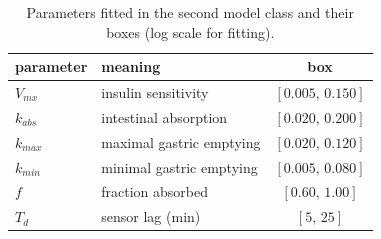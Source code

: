 \begin{table}[h]
\centering\small
\begin{tabular}{llc}
\toprule
parameter & meaning & box \\
\midrule
$V_{mx}$ & insulin sensitivity & $[0.005,\,0.150]$ \\
$k_{abs}$ & intestinal absorption & $[0.020,\,0.200]$ \\
$k_{max}$ & maximal gastric emptying & $[0.020,\,0.120]$ \\
$k_{min}$ & minimal gastric emptying & $[0.005,\,0.080]$ \\
$f$ & fraction absorbed & $[0.60,\,1.00]$ \\
$T_d$ & sensor lag (min) & $[5,\,25]$ \\
\bottomrule
\end{tabular}
\caption{Parameters fitted in the second model class and their boxes (log scale for fitting).}
\label{tab:dm}
\end{table}
